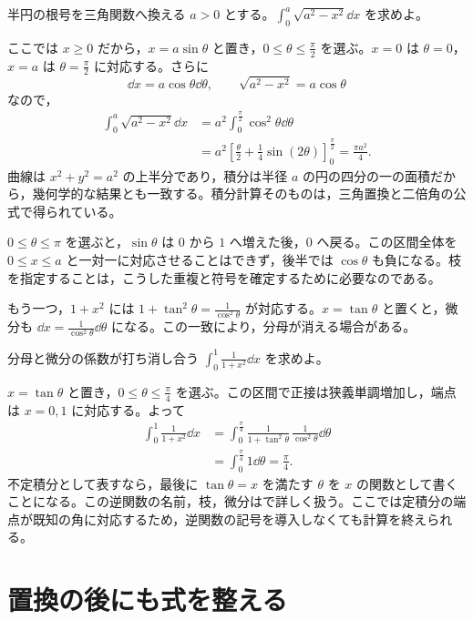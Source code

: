 \begin{example}{半円の根号を三角関数へ換える}
$a>0$ とする。$\int_0^a\sqrt{a^2-x^2}\dd x$ を求めよ。
\end{example}

ここでは $x\ge0$ だから，$x=a\sin\theta$ と置き，$0\le\theta\le\frac\pi2$ を選ぶ。$x=0$ は $\theta=0$，$x=a$ は $\theta=\frac\pi2$ に対応する。さらに
\[
 \dd x=a\cos\theta\dd\theta,\qquad
 \sqrt{a^2-x^2}=a\cos\theta
\]
なので，
\[
\begin{aligned}
 \int_0^a\sqrt{a^2-x^2}\dd x
 &=a^2\int_0^{\frac\pi2}\cos^2\theta\dd\theta\\
 &=a^2\left[\frac\theta2+\frac14\sin(2\theta)\right]_0^{\frac\pi2}
 =\frac{\pi a^2}{4}.
\end{aligned}
\]
曲線は $x^2+y^2=a^2$ の上半分であり，積分は半径 $a$ の円の四分の一の面積だから，幾何学的な結果とも一致する。積分計算そのものは，三角置換と二倍角の公式で得られている。

$0\le\theta\le\pi$ を選ぶと，$\sin\theta$ は $0$ から $1$ へ増えた後，$0$ へ戻る。この区間全体を $0\le x\le a$ と一対一に対応させることはできず，後半では $\cos\theta$ も負になる。枝を指定することは，こうした重複と符号を確定するために必要なのである。

もう一つ，$1+x^2$ には $1+\tan^2\theta=\frac1{\cos^2\theta}$ が対応する。$x=\tan\theta$ と置くと，微分も $\dd x=\frac1{\cos^2\theta}\dd\theta$ になる。この一致により，分母が消える場合がある。

\begin{example}{分母と微分の係数が打ち消し合う}
$\int_0^1\frac1{1+x^2}\dd x$ を求めよ。
\end{example}

$x=\tan\theta$ と置き，$0\le\theta\le\frac\pi4$ を選ぶ。この区間で正接は狭義単調増加し，端点は $x=0,1$ に対応する。よって
\[
\begin{aligned}
 \int_0^1\frac1{1+x^2}\dd x
 &=\int_0^{\frac\pi4}
   \frac1{1+\tan^2\theta}\,
   \frac1{\cos^2\theta}\dd\theta\\
 &=\int_0^{\frac\pi4}1\dd\theta
 =\frac\pi4.
\end{aligned}
\]
不定積分として表すなら，最後に $\tan\theta=x$ を満たす $\theta$ を $x$ の関数として書くことになる。この逆関数の名前，枝，微分はで詳しく扱う。ここでは定積分の端点が既知の角に対応するため，逆関数の記号を導入しなくても計算を終えられる。

\section{置換の後にも式を整える}\label{節:置換後の整理}

